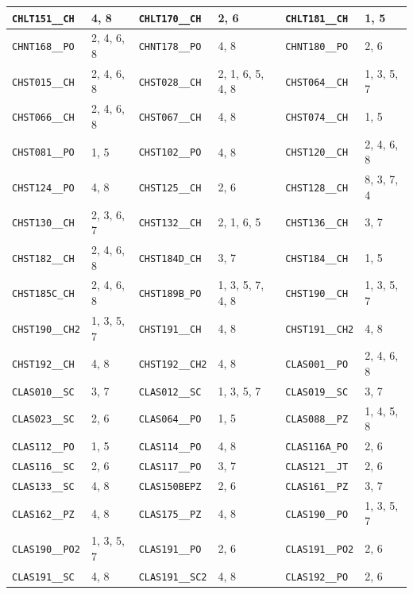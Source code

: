 \begin{longtable}{|l|l||l|l||l|l|}
    \verb|CHLT151__CH| & 4, 8 & \verb|CHLT170__CH| & 2, 6 & \verb|CHLT181__CH| & 1, 5\\\hline
    \verb|CHNT168__PO| & 2, 4, 6, 8 & \verb|CHNT178__PO| & 4, 8 & \verb|CHNT180__PO| & 2, 6\\\hline
    \verb|CHST015__CH| & 2, 4, 6, 8 & \verb|CHST028__CH| & 2, 1, 6, 5, 4, 8 & \verb|CHST064__CH| & 1, 3, 5, 7\\\hline
    \verb|CHST066__CH| & 2, 4, 6, 8 & \verb|CHST067__CH| & 4, 8 & \verb|CHST074__CH| & 1, 5\\\hline
    \verb|CHST081__PO| & 1, 5 & \verb|CHST102__PO| & 4, 8 & \verb|CHST120__CH| & 2, 4, 6, 8\\\hline
    \verb|CHST124__PO| & 4, 8 & \verb|CHST125__CH| & 2, 6 & \verb|CHST128__CH| & 8, 3, 7, 4\\\hline
    \verb|CHST130__CH| & 2, 3, 6, 7 & \verb|CHST132__CH| & 2, 1, 6, 5 & \verb|CHST136__CH| & 3, 7\\\hline
    \verb|CHST182__CH| & 2, 4, 6, 8 & \verb|CHST184D_CH| & 3, 7 & \verb|CHST184__CH| & 1, 5\\\hline
    \verb|CHST185C_CH| & 2, 4, 6, 8 & \verb|CHST189B_PO| & 1, 3, 5, 7, 4, 8 & \verb|CHST190__CH| & 1, 3, 5, 7\\\hline
    \verb|CHST190__CH2| & 1, 3, 5, 7 & \verb|CHST191__CH| & 4, 8 & \verb|CHST191__CH2| & 4, 8\\\hline
    \verb|CHST192__CH| & 4, 8 & \verb|CHST192__CH2| & 4, 8 & \verb|CLAS001__PO| & 2, 4, 6, 8\\\hline
    \verb|CLAS010__SC| & 3, 7 & \verb|CLAS012__SC| & 1, 3, 5, 7 & \verb|CLAS019__SC| & 3, 7\\\hline
    \verb|CLAS023__SC| & 2, 6 & \verb|CLAS064__PO| & 1, 5 & \verb|CLAS088__PZ| & 1, 4, 5, 8\\\hline
    \verb|CLAS112__PO| & 1, 5 & \verb|CLAS114__PO| & 4, 8 & \verb|CLAS116A_PO| & 2, 6\\\hline
    \verb|CLAS116__SC| & 2, 6 & \verb|CLAS117__PO| & 3, 7 & \verb|CLAS121__JT| & 2, 6\\\hline
    \verb|CLAS133__SC| & 4, 8 & \verb|CLAS150BEPZ| & 2, 6 & \verb|CLAS161__PZ| & 3, 7\\\hline
    \verb|CLAS162__PZ| & 4, 8 & \verb|CLAS175__PZ| & 4, 8 & \verb|CLAS190__PO| & 1, 3, 5, 7\\\hline
    \verb|CLAS190__PO2| & 1, 3, 5, 7 & \verb|CLAS191__PO| & 2, 6 & \verb|CLAS191__PO2| & 2, 6\\\hline
    \verb|CLAS191__SC| & 4, 8 & \verb|CLAS191__SC2| & 4, 8 & \verb|CLAS192__PO| & 2, 6\\\hline

\end{longtable}
